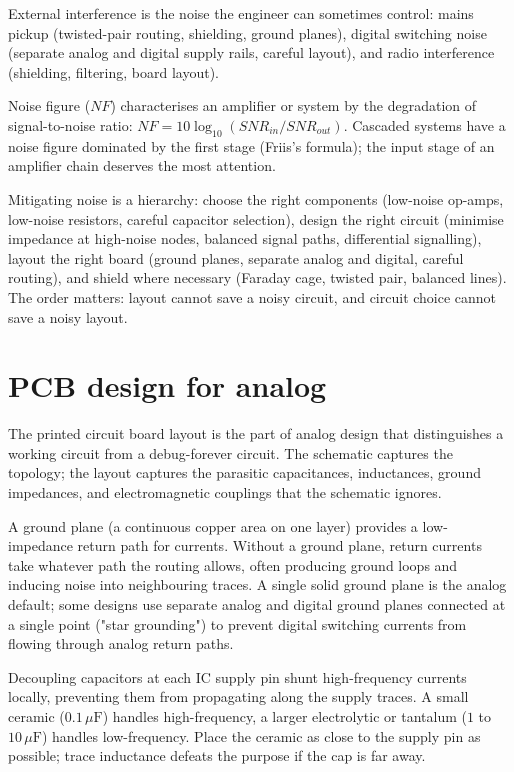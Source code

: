 External interference is the noise the engineer can sometimes control: mains pickup (twisted-pair routing, shielding, ground planes), digital switching noise (separate analog and digital supply rails, careful layout), and radio interference (shielding, filtering, board layout).

Noise figure ($NF$) characterises an amplifier or system by the degradation of signal-to-noise ratio: $NF = 10\log_{10}(SNR_{in}/SNR_{out})$. Cascaded systems have a noise figure dominated by the first stage (Friis's formula); the input stage of an amplifier chain deserves the most attention.

Mitigating noise is a hierarchy: choose the right components (low-noise op-amps, low-noise resistors, careful capacitor selection), design the right circuit (minimise impedance at high-noise nodes, balanced signal paths, differential signalling), layout the right board (ground planes, separate analog and digital, careful routing), and shield where necessary (Faraday cage, twisted pair, balanced lines). The order matters: layout cannot save a noisy circuit, and circuit choice cannot save a noisy layout.

\section{PCB design for analog}

The printed circuit board layout is the part of analog design that distinguishes a working circuit from a debug-forever circuit. The schematic captures the topology; the layout captures the parasitic capacitances, inductances, ground impedances, and electromagnetic couplings that the schematic ignores.

A ground plane (a continuous copper area on one layer) provides a low-impedance return path for currents. Without a ground plane, return currents take whatever path the routing allows, often producing ground loops and inducing noise into neighbouring traces. A single solid ground plane is the analog default; some designs use separate analog and digital ground planes connected at a single point ("star grounding") to prevent digital switching currents from flowing through analog return paths.

Decoupling capacitors at each IC supply pin shunt high-frequency currents locally, preventing them from propagating along the supply traces. A small ceramic ($0.1\,\mu\text{F}$) handles high-frequency, a larger electrolytic or tantalum ($1$ to $10\,\mu\text{F}$) handles low-frequency. Place the ceramic as close to the supply pin as possible; trace inductance defeats the purpose if the cap is far away.

